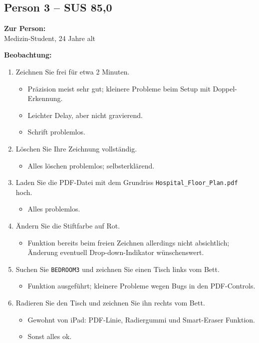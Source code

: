 \subsection{Person 3 – SUS 85,0}
\textbf{Zur Person:}\\
Medizin-Student, 24 Jahre alt

\textbf{Beobachtung:}
\begin{enumerate}
\item Zeichnen Sie frei für etwa 2 Minuten.
\begin{itemize}
\item Präzision meist sehr gut; kleinere Probleme beim Setup mit Doppel-Erkennung.
\item Leichter Delay, aber nicht gravierend.
\item Schrift problemlos.
\end{itemize}

\item Löschen Sie Ihre Zeichnung vollständig.
\begin{itemize}
    \item Alles löschen problemlos; selbsterklärend.
\end{itemize}

\item Laden Sie die PDF-Datei mit dem Grundriss \texttt{Hospital\_Floor\_Plan.pdf} hoch.
\begin{itemize}
    \item Alles problemlos.
\end{itemize}

\item Ändern Sie die Stiftfarbe auf Rot.
\begin{itemize}
    \item Funktion bereits beim freien Zeichnen allerdings nicht absichtlich; Änderung eventuell Drop-down-Indikator wünschenswert.
\end{itemize}

\item Suchen Sie \texttt{BEDROOM3} und zeichnen Sie einen Tisch links vom Bett.
\begin{itemize}
    \item Funktion ausgeführt; kleinere Probleme wegen Bugs in den PDF-Controls.
\end{itemize}

\item Radieren Sie den Tisch und zeichnen Sie ihn rechts vom Bett.
\begin{itemize}
    \item Gewohnt von iPad: PDF-Linie, Radiergummi und Smart-Eraser Funktion.
    \item Sonst alles ok.
\end{itemize}


\end{enumerate}
